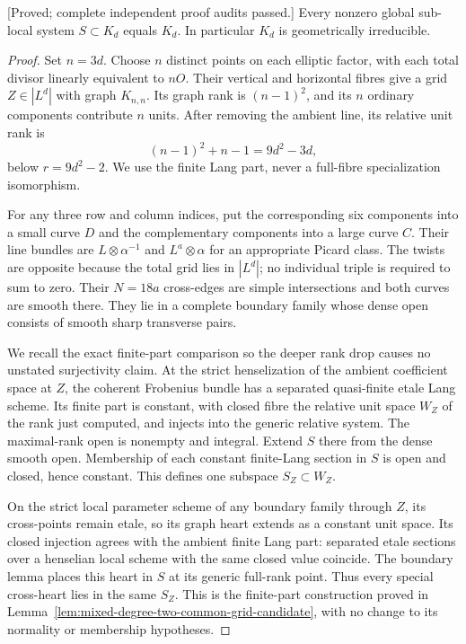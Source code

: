 \begin{lemma}
\label{lem:mixed-even-uniform-common-grid-candidate}
\textup{[Proved; complete independent proof audits passed.]}
Every nonzero global sub-local system $S\subset K_d$
equals $K_d$. In particular $K_d$ is geometrically irreducible.
\end{lemma}
\begin{proof}
Set $n=3d$. Choose $n$ distinct points on each elliptic
factor, with each total divisor linearly equivalent to
$nO$. Their vertical and horizontal fibres give a grid
$Z\in|L^d|$ with graph $K_{n,n}$. Its graph rank is
$(n-1)^2$, and its $n$ ordinary components contribute
$n$ units. After removing the ambient line, its relative
unit rank is
\[
                (n-1)^2+n-1=9d^2-3d,
\]
below $r=9d^2-2$. We use the finite Lang part, never a
full-fibre specialization isomorphism.

For any three row and column indices, put the corresponding
six components into a small curve $D$ and the complementary
components into a large curve $C$. Their line bundles are
$L\otimes\alpha^{-1}$ and $L^a\otimes\alpha$ for an
appropriate Picard class. The twists are opposite because
the total grid lies in $|L^d|$; no individual triple is
required to sum to zero. Their $N=18a$ cross-edges are
simple intersections and both curves are smooth there.
They lie in a complete boundary family whose dense open
consists of smooth sharp transverse pairs.

We recall the exact finite-part comparison so the deeper
rank drop causes no unstated surjectivity claim. At the
strict henselization of the ambient coefficient space at
$Z$, the coherent Frobenius bundle has a separated
quasi-finite etale Lang scheme. Its finite part is constant,
with closed fibre the relative unit space $W_Z$ of the
rank just computed, and injects into the generic relative
system. The maximal-rank open is nonempty and integral.
Extend $S$ there from the dense smooth open. Membership
of each constant finite-Lang section in $S$ is open and
closed, hence constant. This defines one subspace
$S_Z\subset W_Z$.

On the strict local parameter scheme of any boundary
family through $Z$, its cross-points remain etale, so
its graph heart extends as a constant unit space. Its
closed injection agrees with the ambient finite Lang
part: separated etale sections over a henselian local
scheme with the same closed value coincide. The boundary
lemma places this heart in $S$ at its generic full-rank
point. Thus every special cross-heart lies in the same
$S_Z$. This is the finite-part construction proved in
Lemma~\ref{lem:mixed-degree-two-common-grid-candidate},
with no change to its normality or membership hypotheses.


\end{proof}
